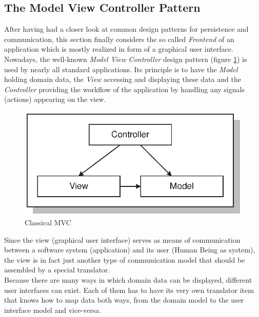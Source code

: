 \subsection{The Model View Controller Pattern}
\label{model_view_controller_pattern_section}

After having had a closer look at common design patterns for persistence and
communication, this section finally considers the so called \emph{Frontend} of
an application which is mostly realized in form of a graphical user interface.\\
Nowadays, the well-known \emph{Model View Controller} design pattern
(figure \ref{modelviewcontroller_figure}) is used by nearly all standard applications.
Its principle is to have the \emph{Model} holding domain data, the \emph{View}
accessing and displaying these data and the \emph{Controller} providing the workflow
of the application by handling any signals (actions) appearing on the view.

\begin{figure}[ht]
    \begin{center}
       \includegraphics[scale=0.7]{images/model_view_controller_pattern.eps}
       \caption{Classical MVC}
       \label{modelviewcontroller_figure}
    \end{center}
\end{figure}

Since the view (graphical user interface) serves as means of communication between
a software system (application) and its user (Human Being as system), the view
is in fact just another type of communication model that should be assembled
by a special translator.\\
Because there are many ways in which domain data can be displayed, different
user interfaces can exist. Each of them has to have its very own translator item
that knows how to map data both ways, from the domain model to the user interface
model and vice-versa.
